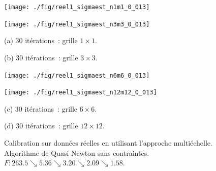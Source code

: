 \pagebreak

\begin{figure}[!htbp]

\begin{center}
\begin{minipage}{5.8cm}
\centerline{\texttt{[image: ./fig/reel1\_sigmaest\_n1m1\_0\_013]}
} 
\end{minipage}
\hspace*{0.1cm}
\begin{minipage}{5.8cm}
\centerline{\texttt{[image: ./fig/reel1\_sigmaest\_n3m3\_0\_013]}
}
\end{minipage}
\end{center}

\begin{center}
\begin{minipage}{5.8cm}
(a) $30$ it\'erations~: grille $1 \times 1$.
\end{minipage}
\hspace*{0.1cm}
\begin{minipage}{5.8cm}
(b) $30$ it\'erations~: grille $3 \times 3$.
\end{minipage}
\end{center}

\medskip

\begin{center}
\begin{minipage}{5.8cm}
\centerline{\texttt{[image: ./fig/reel1\_sigmaest\_n6m6\_0\_013]}
}
\end{minipage}
\hspace*{0.1cm}
\begin{minipage}{5.8cm}
\centerline{\texttt{[image: ./fig/reel1\_sigmaest\_n12m12\_0\_013]}
}
\end{minipage}
\end{center}

\begin{center}
\begin{minipage}{5.8cm}
(c) $30$ it\'erations~: grille $6 \times 6$.
\end{minipage}
\hspace*{0.1cm}
\begin{minipage}{5.8cm}
(d) $30$ it\'erations~: grille $12 \times 12$.
\end{minipage}
\end{center}

\caption{Calibration sur donn\'ees r\'eelles en utilisant 
l'approche multi\'echelle. Algorithme de Quasi-Newton 
sans contraintes. \newline
$F : 263.5 \searrow 5.36 \searrow 3.20 
\searrow 2.09 \searrow 1.58$.
}
\label{FIG:REEL1_AVEC}
\end{figure}

